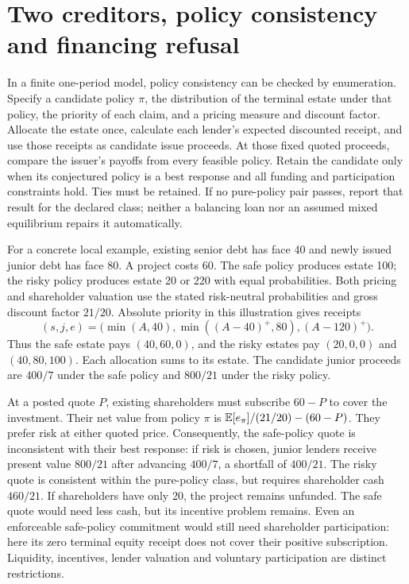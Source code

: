 


\section{Two creditors, policy consistency and financing refusal}
In a finite one-period model, policy consistency can be checked by enumeration.
Specify a candidate policy $\pi$, the distribution of the terminal estate under
that policy, the priority of each claim, and a pricing measure and discount
factor. Allocate the estate once, calculate each lender's expected discounted
receipt, and use those receipts as candidate issue proceeds. At those fixed
quoted proceeds, compare the issuer's payoffs from every feasible policy.
Retain the candidate only when its conjectured policy is a best response and
all funding and participation constraints hold. Ties must be retained. If no
pure-policy pair passes, report that result for the declared class; neither a
balancing loan nor an assumed mixed equilibrium repairs it automatically.

For a concrete local example, existing senior debt has face 40 and newly issued
junior debt has face 80. A project costs 60. The safe policy produces estate 100;
the risky policy produces estate 20 or 220 with equal probabilities. Both pricing
and shareholder valuation use the stated risk-neutral probabilities and gross
discount factor $21/20$. Absolute priority in this illustration gives receipts
\begin{equation}
(s,j,e)=\bigl(\min(A,40),\min((A-40)^+,80),(A-120)^+\bigr).
\end{equation}
Thus the safe estate pays $(40,60,0)$, and the risky estates pay $(20,0,0)$
and $(40,80,100)$. Each allocation sums to its estate. The candidate junior
proceeds are $400/7$ under the safe policy and $800/21$ under the risky policy.

At a posted quote $P$, existing shareholders must subscribe $60-P$ to cover
the investment. Their net value from policy $\pi$ is
$\mathbb{E}[e_\pi]/(21/20)-(60-P)$. They prefer risk at either quoted price.
Consequently, the safe-policy quote is inconsistent with their best response:
if risk is chosen, junior lenders receive present value $800/21$ after advancing
$400/7$, a shortfall of $400/21$. The risky quote is consistent within the
pure-policy class, but requires shareholder cash $460/21$. If shareholders
have only 20, the project remains unfunded. The safe quote would need less cash,
but its incentive problem remains. Even an enforceable safe-policy commitment
would still need shareholder participation: here its zero terminal equity
receipt does not cover their positive subscription. Liquidity, incentives,
lender valuation and voluntary participation are distinct restrictions.

